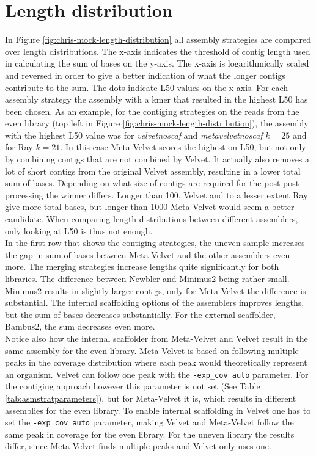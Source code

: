 \documentclass[a4paper,12pt]{report}
\begin{document}
\clearpage

\section{Length distribution}
\label{res:len}

In Figure \ref{fig:chris-mock-length-distribution} all assembly strategies are
compared over length distributions. The x-axis indicates the threshold of
contig length used in calculating the sum of bases on the y-axis. The x-axis is
logarithmically scaled and reversed in order to give a better indication of
what the longer contigs contribute to the sum. The dots indicate L50 values on
the x-axis.  For each assembly strategy the assembly with a kmer that resulted
in the highest L50 has been chosen. As an example, for the contiging strategies
on the reads from the even library (top left in Figure
\ref{fig:chris-mock-length-distribution}), the assembly with the highest L50
value was for {\em velvetnoscaf} and {\em metavelvetnoscaf} $k=25$ and for Ray
$k=21$.  In this case Meta-Velvet scores the highest on L50, but not only by
combining contigs that are not combined by Velvet. It actually also removes a
lot of short contigs from the original Velvet assembly, resulting in a lower
total sum of bases. Depending on what size of contigs are required for the post
post-processing the winner differs. Longer than 100, Velvet and to a lesser
extent Ray give more total bases, but longer than 1000 Meta-Velvet would seem a
better candidate. When comparing length distributions between different
assemblers, only looking at L50 is thus not enough.\\

In the first row that shows the contiging strategies, the uneven sample
increases the gap in sum of bases between Meta-Velvet and the other assemblers
even more. The merging strategies increase lengths quite significantly for both
libraries. The difference between Newbler and Minimus2 being rather small.
Minimus2 results in slightly larger contigs, only for Meta-Velvet the
difference is substantial. The internal scaffolding options of the assemblers
improves lengths, but the sum of bases decreases substantially. For the
external scaffolder, Bambus2, the sum decreases even more.\\


Notice also how the internal scaffolder from Meta-Velvet and Velvet result in
the same assembly for the even library. Meta-Velvet is based on following
multiple peaks in the coverage distribution where each peak would theoretically
represent an organism. Velvet can follow one peak with the \verb!-exp_cov auto!
parameter. For the contiging approach however this parameter is not set (See
Table \ref{tab:asmstratparameters}), but for Meta-Velvet it is, which results
in different assemblies for the even library.  To enable internal scaffolding
in Velvet one has to set the \verb!-exp_cov auto!  parameter, making Velvet and
Meta-Velvet follow the same peak in coverage for the even library. For the
uneven library the results differ, since Meta-Velvet finds multiple peaks and
Velvet only uses one. 
\end{document}
